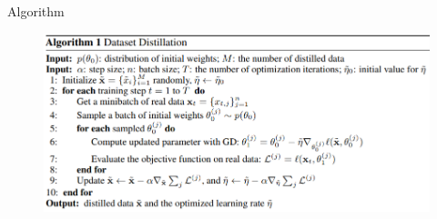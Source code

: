 \documentclass{beamer}
\begin{document}
\begin{frame}{Algorithm}
\begin{figure}[h]
\includegraphics[width=\textwidth]{img/alg1}
\end{figure}
\end{frame}
\end{document}
